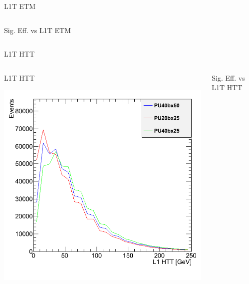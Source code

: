 \documentclass[8pt]{beamer}
\begin{document}
\begin{frame}{L1T ETM}
\begin{columns}
\begin{block}{Sig. Eff. vs L1T ETM}
\end{block}

\end{columns}

\end{frame}

\begin{frame}{L1T HTT}

\begin{columns}

\begin{block}{L1T HTT}
 
\centering
\includegraphics[width=\linewidth]{img/hL1HTT.png}
 
\end{block}

\begin{block}{Sig. Eff. vs L1T HTT}
 

\end{block}
\end{columns}
\end{frame}
\end{document}
